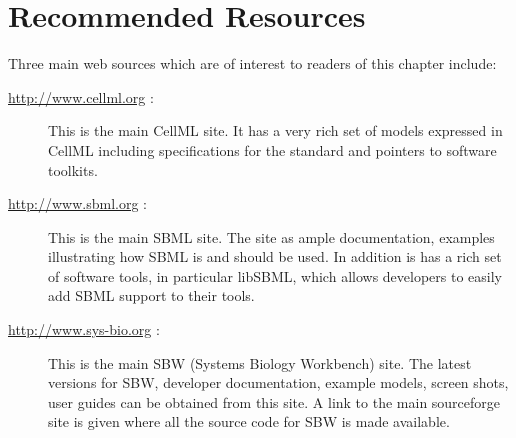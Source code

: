 \section{Recommended Resources}

Three main web sources which are of interest to readers of this chapter
include:

\begin{description}
\item[\url{http://www.cellml.org} :]
This is the main CellML site. It has a very rich set of models expressed
in CellML including specifications for the standard and pointers to
software toolkits.

\item[\url{http://www.sbml.org} :]
This is the main SBML site. The site as ample documentation, examples
illustrating how SBML is and should be used. In addition is has a rich
set of software tools, in particular libSBML, which allows developers to
easily add SBML support to their tools.

\item[\url{http://www.sys-bio.org} :]
This is the main SBW (Systems Biology Workbench) site. The latest
versions for SBW, developer documentation, example models, screen shots,
user guides can be obtained from this site. A link to the main
sourceforge site is given where all the source code for SBW is made
available.
\end{description}
